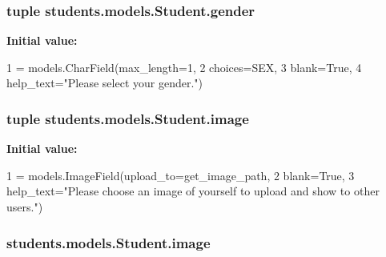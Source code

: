 \hypertarget{classstudents_1_1models_1_1_student_ae8f0e56e008cc61770d2f0f5b5ca6182}{
\subsubsection[{gender}]{\setlength{\rightskip}{0pt plus 5cm}tuple students.\-models.\-Student.\-gender\hspace{0.3cm}{\ttfamily [static]}}}\label{classstudents_1_1models_1_1_student_ae8f0e56e008cc61770d2f0f5b5ca6182}
{\bfseries Initial value\-:}
\begin{DoxyCode}
1 = models.CharField(max\_length=1,
2                               choices=SEX,
3                               blank=\textcolor{keyword}{True},
4                               help\_text=\textcolor{stringliteral}{"Please select your gender."})
\end{DoxyCode}
\hypertarget{classstudents_1_1models_1_1_student_a37eca324de73539147a0083dfdf735ac}{
\subsubsection[{image}]{\setlength{\rightskip}{0pt plus 5cm}tuple students.\-models.\-Student.\-image\hspace{0.3cm}{\ttfamily [static]}}}\label{classstudents_1_1models_1_1_student_a37eca324de73539147a0083dfdf735ac}
{\bfseries Initial value\-:}
\begin{DoxyCode}
1 = models.ImageField(upload\_to=get\_image\_path,
2                               blank=\textcolor{keyword}{True},
3                               help\_text=\textcolor{stringliteral}{"Please choose an image of yourself to upload and show to other
       users."})
\end{DoxyCode}
\hypertarget{classstudents_1_1models_1_1_student_a6f81eac38fb0a6074eb663b3cab8055e}{
\subsubsection[{image}]{\setlength{\rightskip}{0pt plus 5cm}students.\-models.\-Student.\-image}}\label{classstudents_1_1models_1_1_student_a6f81eac38fb0a6074eb663b3cab8055e}
